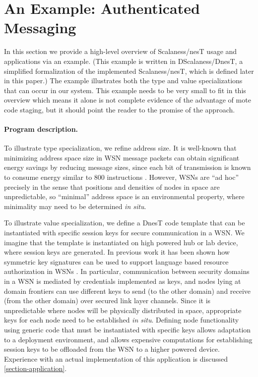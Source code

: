 \section{An Example: Authenticated Messaging}
\label{section-overview}

In this section we provide a high-level overview of Scalaness/nesT usage and applications via an
example. (This example is written in DScalaness/DnesT, a simplified formalization of the
implemented Scalaness/nesT, which is defined later in this paper.) The example illustrates both
the type and value specializations that can occur in our system. This example needs to be very
small to fit in this overview which means it alone is not complete evidence of the advantage of
mote code staging, but it should point the reader to the promise of the approach.

\paragraph{Program description.} To illustrate type specialization, we refine address size. It
is well-known that minimizing address space size in WSN message packets can obtain significant
energy savings by reducing message sizes, since each bit of transmission is known to consume
energy similar to 800 instructions \cite{tag}. However, WSNs are ``ad hoc'' precisely in the
sense that positions and densities of nodes in space are unpredictable, so ``minimal'' address
space is an environmental property, where minimality may need to be determined \emph{in situ}.

To illustrate value specialization, we define a DnesT code template that can be instantiated
with specific session keys for secure communication in a WSN. We imagine that the template is
instantiated on high powered hub or lab device, where session keys are generated. In previous
work it has been shown how symmetric key signatures can be used to support language based
resource authorization in WSNs \cite{chapin-skalka-SpartanRPC,chapin-skalka-SpartanRPCTR}. In
particular, communication between security domains in a WSN is mediated by credentials
implemented as keys, and nodes lying at domain frontiers can use different keys to send (to the
other domain) and receive (from the other domain) over secured link layer channels. Since it is
unpredictable where nodes will be physically distributed in space, appropriate keys for each
node need to be established \emph{in situ}. Defining node functionality using generic code that
must be instantiated with specific keys allows adaptation to a deployment environment, and
allows expensive computations for establishing session keys to be offloaded from the WSN to a
higher powered device. Experience with an actual implementation of this application is discussed
\autoref{section-application}.

